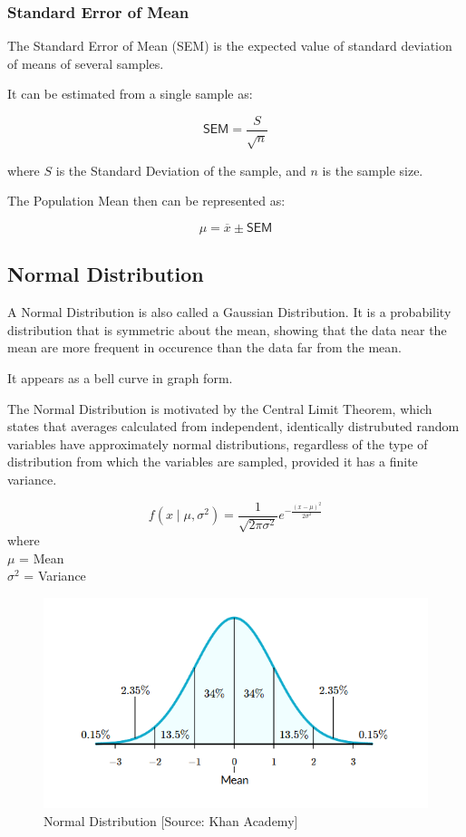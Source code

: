 \documentclass[twocolumn]{article}
\begin{document}
\subsubsection*{Standard Error of Mean}

The Standard Error of Mean (SEM) is the expected value of standard deviation of means of several samples. 

It can be estimated from a single sample as:

\[
    \textsf{SEM} = \frac{S}{\sqrt{n}} 
\]

where $S$ is the Standard Deviation of the sample, and $n$ is the sample size. 

The Population Mean then can be represented as:

\[
    \mu = \overline{x} \pm \textsf{SEM} 
\]

\subsection{Normal Distribution}

A Normal Distribution is also called a Gaussian Distribution. It is a probability distribution that is symmetric about the mean, showing that the data near the mean are more frequent in occurence than the data far from the mean. 

It appears as a bell curve in graph form.

The Normal Distribution is motivated by the Central Limit Theorem, which states that averages calculated from independent, identically distrubuted random variables have approximately normal distributions, regardless of the type of distribution from which the variables are sampled, provided it has a finite variance. 


\[
    f(x \mid \mu, \sigma^2) = \frac{1}{\sqrt{2\pi \sigma^2}} e^{-\frac{(x-\mu)^2}{2\sigma^2}} 
\]
where\\
$\mu$ = Mean\\
$\sigma^2$ = Variance

\begin{figure}[h]
\includegraphics[width = \linewidth]{Normal Distribution Khan Academy.png}
\caption{Normal Distribution [Source: Khan Academy]}
\end{figure}
\end{document}

